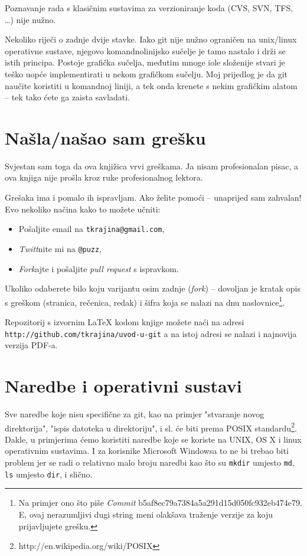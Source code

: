 Poznavanje rada s klasičnim sustavima za verzioniranje koda (CVS, SVN, TFS, \dots) nije nužno.

Nekoliko riječi o zadnje dvije stavke.
Iako git nije nužno ograničen na unix/linux operativne sustave, njegovo komandnolinijsko sučelje je tamo nastalo i drži se istih principa.
Postoje grafička sučelja, međutim mnoge iole složenije stvari je teško uopće implementirati u nekom grafičkom sučelju. 
Moj prijedlog je da git naučite koristiti u komandnoj liniji, a tek onda krenete s nekim grafičkim alatom -- tek tako ćete ga zaista savladati.

\section*{Našla/našao sam grešku}

Svjestan sam toga da ova knjižica vrvi greškama.
Ja nisam profesionalan pisac, a ova knjiga nije prošla kroz ruke profesionalnog lektora.

Grešaka ima i pomalo ih ispravljam.
Ako želite pomoći -- unaprijed sam zahvalan!
Evo nekoliko načina kako to možete učniti:

\begin{itemize}
    \item Pošaljite email na \verb+tkrajina@gmail.com+,
    \item \emph{Twitt}nite mi na \verb+@puzz+,
    \item \emph{Fork}ajte i pošaljite \emph{pull request} s ispravkom. 
\end{itemize}

Ukoliko odaberete bilo koju varijantu osim zadnje (\emph{fork}) -- dovoljan je kratak opis s greškom (stranica, rečenica, redak) i šifra koja se nalazi na dnu naslovnice\footnote{Na primjer ono što piše \emph{Commit} b5af8ec79a7384a5a291d15d050fc932eb474e79. E, ovaj nerazumljivi dugi string meni olakšava traženje verzije za koju prijavljujete grešku.}.

Repozitorij s izvornim \LaTeX{} kodom knjige možete naći na adresi \\\verb+http://github.com/tkrajina/uvod-u-git+
 a na istoj adresi se nalazi i najnovija verzija PDF-a.

\section*{Naredbe i operativni sustavi}

Sve naredbe koje nisu specifične za git, kao na primjer "stvaranje novog direktorija", "ispis datoteka u direktoriju", i sl. će biti prema POSIX standardu\footnote{http://en.wikipedia.org/wiki/POSIX}.
Dakle, u primjerima ćemo koristiti naredbe koje se koriste na UNIX, OS X i linux operativnim sustavima. 
I za korisnike Microsoft Windowsa to ne bi trebao biti problem jer se radi o relativno malo broju naredbi kao što su \verb+mkdir+ umjesto \verb+md+, \verb+ls+ umjesto \verb+dir+, i slično.

